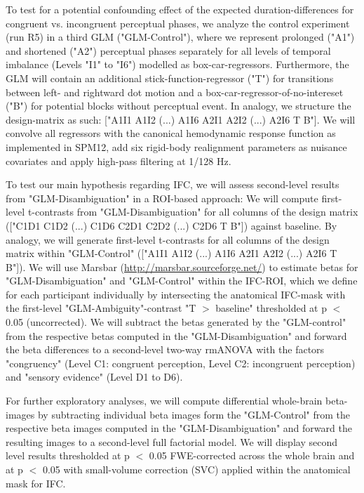 \documentclass[12pt]{article}
\begin{document}
To test for a potential confounding effect of the expected duration-differences for congruent vs. incongruent perceptual phases, we analyze the control experiment (run R5) in a third GLM ("GLM-Control"), where we represent prolonged ("A1") and shortened ("A2") perceptual phases separately for all levels of temporal imbalance (Levels "I1" to "I6") modelled as box-car-regressors. Furthermore, the GLM will contain an additional stick-function-regressor ("T") for transitions between left- and rightward dot motion and a box-car-regressor-of-no-intereset ("B") for potential blocks without perceptual event. In analogy, we structure the design-matrix as such: ["A1I1 A1I2 (...) A1I6 A2I1 A2I2 (...) A2I6 T B"]. 
We will convolve all regressors with the canonical hemodynamic response function as implemented in SPM12, add six rigid-body realignment parameters as nuisance covariates and apply high-pass filtering at 1/128 Hz. 

To test our main hypothesis regarding IFC, we will assess second-level results from "GLM-Disambiguation" in a ROI-based approach: We will compute first-level t-contrasts from "GLM-Disambiguation" for all columns of the design matrix (["C1D1 C1D2 (...) C1D6 C2D1 C2D2 (...) C2D6 T B"]) against baseline. By analogy, we will generate first-level t-contrasts for all columns of the design matrix within "GLM-Control" (["A1I1 A1I2 (...) A1I6 A2I1 A2I2 (...) A2I6 T B"]). We will use Marsbar (\url{http://marsbar.sourceforge.net/}) to estimate betas for "GLM-Disambiguation" and "GLM-Control" within the IFC-ROI, which we define for each participant individually by intersecting the anatomical IFC-mask with the first-level "GLM-Ambiguity"-contrast "T $>$ baseline" thresholded at p $<$ 0.05 (uncorrected). We will subtract the betas generated by the "GLM-control" from the respective betas computed in the "GLM-Disambiguation" and forward the beta differences to a second-level two-way rmANOVA with the factors "congruency" (Level C1: congruent perception, Level C2: incongruent perception) and "sensory evidence" (Level D1 to D6).

For further exploratory analyses, we will compute differential whole-brain beta-images by subtracting individual beta images form the "GLM-Control" from the respective beta images computed in the "GLM-Disambiguation" and forward the resulting images to a second-level full factorial model. We will display second level results thresholded at p $<$ 0.05 FWE-corrected across the whole brain and at p $<$ 0.05 with small-volume correction (SVC) applied within the anatomical mask for IFC.
\end{document}
